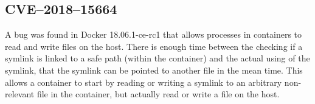\subsection{CVE--2018--15664}
A bug was found in Docker 18.06.1-ce-rc1 that allows processes in containers to read and write files on the host\cite{CVE-2018-15664-Openwall}\cite{CVE-2018-15664-Bugzilla}. There is enough time between the checking if a symlink is linked to a safe path (within the container) and the actual using of the symlink, that the symlink can be pointed to another file in the mean time. This allows a container to start by reading or writing a symlink to an arbitrary non-relevant file in the container, but actually read or write a file on the host.
